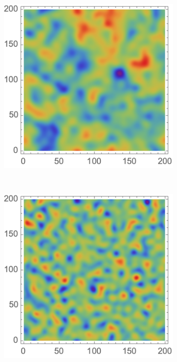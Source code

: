 \documentclass[a4paper, 11pt]{article}
\begin{document}
\begin{figure}
\centering
\begin{subfigure}[b]{0.49\textwidth}
\includegraphics[width=\textwidth]{Psi}
\end{subfigure}~
\begin{subfigure}[b]{0.49\textwidth}
\includegraphics[width=\textwidth]{Rho}

\end{subfigure}
\end{figure}
\end{document}
